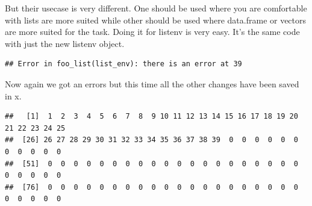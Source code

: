 \documentclass[
]{book}
\newenvironment{Shaded}{\begin{snugshade}}{\end{snugshade}}
\newcommand{\ControlFlowTok}[1]{\textcolor[rgb]{0.13,0.29,0.53}{\textbf{#1}}}
\newcommand{\DecValTok}[1]{\textcolor[rgb]{0.00,0.00,0.81}{#1}}
\newcommand{\FunctionTok}[1]{\textcolor[rgb]{0.00,0.00,0.00}{#1}}
\newcommand{\NormalTok}[1]{#1}
\newcommand{\OtherTok}[1]{\textcolor[rgb]{0.56,0.35,0.01}{#1}}
\newcommand{\SpecialCharTok}[1]{\textcolor[rgb]{0.00,0.00,0.00}{#1}}
\newcommand{\StringTok}[1]{\textcolor[rgb]{0.31,0.60,0.02}{#1}}
\begin{document}
But their usecase is very different. One should be used where you are comfortable with lists are more suited while other should be used where data.frame or vectors are more suited for the task. Doing it for listenv is very easy. It's the same code with just the new listenv object.

\begin{Shaded}
\end{Shaded}

\begin{verbatim}
## Error in foo_list(list_env): there is an error at 39
\end{verbatim}

Now again we got an errors but this time all the other changes have been saved in x.

\begin{Shaded}
\end{Shaded}

\begin{verbatim}
##   [1]  1  2  3  4  5  6  7  8  9 10 11 12 13 14 15 16 17 18 19 20 21 22 23 24 25
##  [26] 26 27 28 29 30 31 32 33 34 35 36 37 38 39  0  0  0  0  0  0  0  0  0  0  0
##  [51]  0  0  0  0  0  0  0  0  0  0  0  0  0  0  0  0  0  0  0  0  0  0  0  0  0
##  [76]  0  0  0  0  0  0  0  0  0  0  0  0  0  0  0  0  0  0  0  0  0  0  0  0  0
\end{verbatim}
\end{document}
